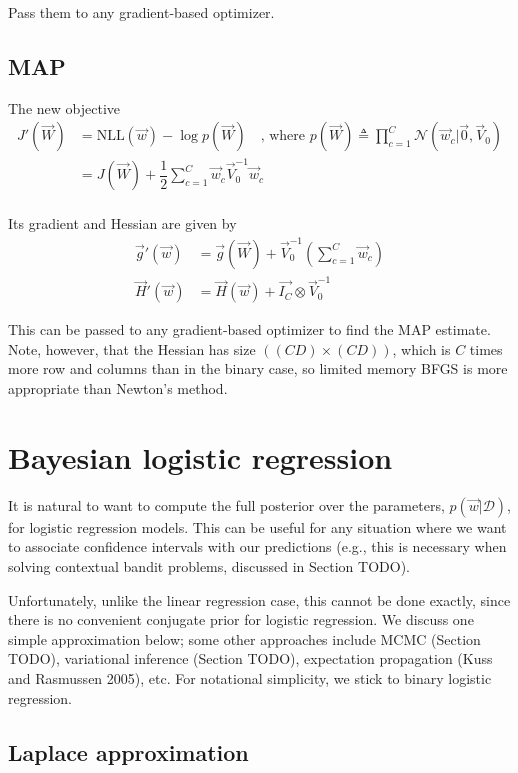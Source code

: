 Pass them to any gradient-based optimizer.


\subsection{MAP}
The new objective
\begin{align}
J'(\vec{W}) & =\mathrm{NLL}(\vec{w})-\log{p(\vec{W})} \quad \text{, where } p(\vec{W}) \triangleq \prod\limits_{c=1}^C \mathcal{N}(\vec{w}_c|\vec{0},\vec{V}_0) \\
   & = J(\vec{W})+\dfrac{1}{2}\sum\limits_{c=1}^C \vec{w}_c\vec{V}_0^{-1}\vec{w}_c \\
\end{align}

Its gradient and Hessian are given by
\begin{align}
\vec{g}'(\vec{w}) & =\vec{g}(\vec{W})+\vec{V}_0^{-1}\left(\sum\limits_{c=1}^C \vec{w}_c\right) \\
\vec{H}'(\vec{w}) & =\vec{H}(\vec{w})+\vec{I_C} \otimes \vec{V}_0^{-1}
\end{align}

This can be passed to any gradient-based optimizer to find the MAP estimate. Note, however, that the Hessian has size $((CD)×(CD))$, which is $C$ times more row and columns than in the binary case, so limited memory BFGS is more appropriate than Newton’s method.


\section{Bayesian logistic regression}
It is natural to want to compute the full posterior over the parameters, $p(\vec{w}|\mathcal{D})$, for logistic regression models. This can be useful for any situation where we want to associate confidence intervals with our predictions (e.g., this is necessary when solving contextual bandit problems, discussed in Section TODO).

Unfortunately, unlike the linear regression case, this cannot be done exactly, since there is no convenient conjugate prior for logistic regression. We discuss one simple approximation below; some other approaches include MCMC (Section TODO), variational inference (Section TODO), expectation propagation (Kuss and Rasmussen 2005), etc. For notational simplicity, we stick to binary logistic regression.


\subsection{Laplace approximation}


